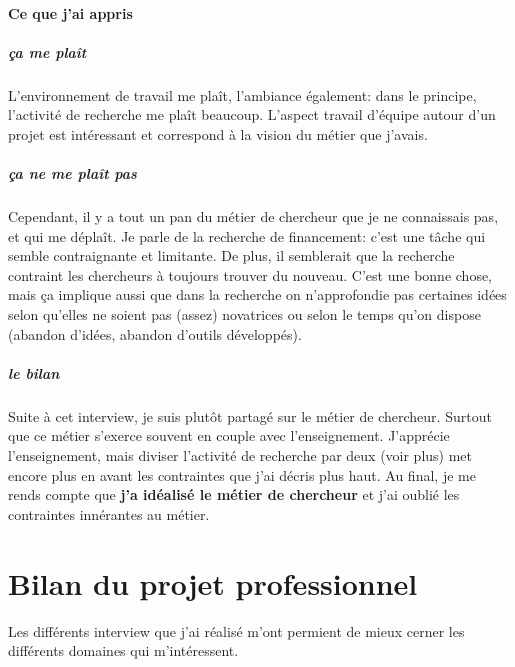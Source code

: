 \documentclass[a4paper,12pt, draft]{report}
\begin{document}
\paragraph{Ce que j'ai appris}
\subparagraph{ça me plaît}
L'environnement de travail me plaît, l'ambiance également: dans le principe, l'activité de recherche me plaît beaucoup. L'aspect travail d'équipe autour d'un projet est intéressant et correspond à la vision du métier que j'avais.
\subparagraph{ça ne me plaît pas}
Cependant, il y a tout un pan du métier de chercheur que je ne connaissais pas, et qui me déplaît. Je parle de la recherche de financement: c'est une tâche qui semble contraignante et limitante. De plus, il semblerait que la recherche contraint les chercheurs à toujours trouver du nouveau. C'est une bonne chose, mais ça implique aussi que dans la recherche on n'approfondie pas certaines idées selon qu'elles ne soient pas (assez) novatrices ou selon le temps qu'on dispose (abandon d'idées, abandon d'outils développés).

\subparagraph{le bilan}
Suite à cet interview, je suis plutôt partagé sur le métier de chercheur.
Surtout que ce métier s'exerce souvent en couple avec l'enseignement. J'apprécie l'enseignement, mais diviser l'activité de recherche par deux (voir plus) met encore plus en avant les contraintes que j'ai décris plus haut.
Au final, je me rends compte que \textbf{j'a idéalisé le métier de chercheur} et j'ai oublié les contraintes innérantes au métier.

\section{Bilan du projet professionnel}
Les différents interview que j'ai réalisé m'ont permient de mieux cerner les différents domaines qui m'intéressent.
\end{document}

